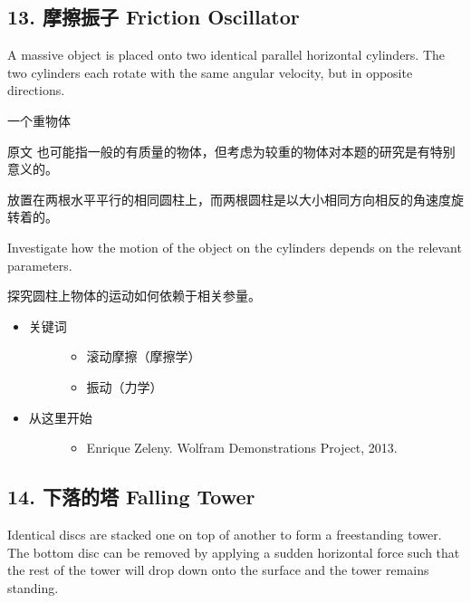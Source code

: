 \documentclass[a4paper,10pt,english]{sphinxmanual}
\begin{document}
\subsection{13. 摩擦振子 Friction Oscillator}
\label{\detokenize{7. Appendix:friction-oscillator}}
A massive object is placed onto two identical parallel horizontal cylinders. The two cylinders each rotate with the same angular velocity, but in opposite directions.

一个重物体 %
\begin{footnote}[7]\sphinxAtStartFootnote
原文  也可能指一般的有质量的物体，但考虑为较重的物体对本题的研究是有特别意义的。
%
\end{footnote} 放置在两根水平平行的相同圆柱上，而两根圆柱是以大小相同方向相反的角速度旋转着的。

Investigate how the motion of the object on the cylinders depends on the relevant parameters.

探究圆柱上物体的运动如何依赖于相关参量。
\begin{itemize}
\item {} \begin{description}
\item[{关键词}] \leavevmode\begin{itemize}
\item {} 
滚动摩擦（摩擦学）

\item {} 
振动（力学）

\end{itemize}

\end{description}

\item {} \begin{description}
\item[{从这里开始}] \leavevmode\begin{itemize}
\item {} 
Enrique Zeleny.  Wolfram Demonstrations Project, 2013.

\end{itemize}

\end{description}

\end{itemize}


\subsection{14. 下落的塔 Falling Tower}
\label{\detokenize{7. Appendix:falling-tower}}
Identical discs are stacked one on top of another to form a freestanding tower. The bottom disc can be removed by applying a sudden horizontal force such that the rest of the tower will drop down onto the surface and the tower remains standing.
\end{document}
